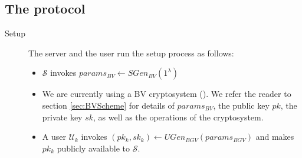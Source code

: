 \subsection{The protocol}
\label{sec:theProtocol}
\begin{description}
	\item[Setup] The server and the user run the setup process as
	follows:
	\begin{itemize}




		\item $\mathcal{S}$ invokes $params_{BV} \gets
		SGen_{BV}(1^\lambda)$
		\item We are currently using a BV cryptosystem
		(\cite{brakerski2011fully}). We refer the reader to section
		\ref{sec:BVScheme} for details of $params_{BV}$, the public
		key $pk$, the private key $sk$, as well as the
		operations of the
		cryptosystem.
		\item A user $\mathcal{U}_k$ invokes $(pk_k,sk_k) \gets
		UGen_{BGV}(params_{BGV})$ and makes $pk_k$ publicly
		available to $\mathcal{S}$.




		\iffalse
		\item $\mathcal{S}$ invokes $params_{GSW} \gets
		SGen_{GSW}(1^\lambda)$
		\item We are currently using GSW cryptosystem
		(\cite{gentry2013homomorphic}).
		We refer the reader to section
		\missref{} for details of $params_{GSW}$, the public
		key $pk$, the private key $sk$, as well as the
		homomorphic operations of the
		cryptosystem.
		\item A user $\mathcal{U}_k$ invokes $(pk_k,sk_k) \gets
		UGen_{GSW}(params_{GSW})$ and make $pp_k$ publicly
		available to $\mathcal{S}$
		\fi



\end{itemize}
\end{description}
